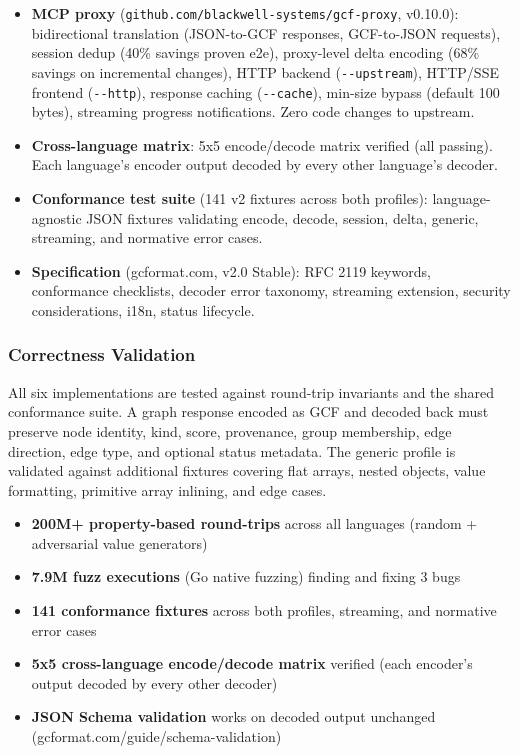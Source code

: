 \documentclass[
  11pt,
  paper=a4,
  ,captions=tableheading
]{scrartcl}
\providecommand{\tightlist}{%
  \setlength{\itemsep}{0pt}\setlength{\parskip}{0pt}}
\begin{document}
\begin{itemize}
  encodeDelta, StreamEncoder, GenericStreamEncoder. CLI with both
  profiles. Zero dependencies.
\item
  \textbf{MCP proxy} (\texttt{github.com/blackwell-systems/gcf-proxy},
  v0.10.0): bidirectional translation (JSON-to-GCF responses,
  GCF-to-JSON requests), session dedup (40\% savings proven e2e),
  proxy-level delta encoding (68\% savings on incremental changes), HTTP
  backend (\texttt{-\/-upstream}), HTTP/SSE frontend
  (\texttt{-\/-http}), response caching (\texttt{-\/-cache}), min-size
  bypass (default 100 bytes), streaming progress notifications. Zero
  code changes to upstream.
\item
  \textbf{Cross-language matrix}: 5x5 encode/decode matrix verified (all
  passing). Each language's encoder output decoded by every other
  language's decoder.
\item
  \textbf{Conformance test suite} (141 v2 fixtures across both
  profiles): language-agnostic JSON fixtures validating encode, decode,
  session, delta, generic, streaming, and normative error cases.
\item
  \textbf{Specification} (gcformat.com, v2.0 Stable): RFC 2119 keywords,
  conformance checklists, decoder error taxonomy, streaming extension,
  security considerations, i18n, status lifecycle.
\end{itemize}

\subsubsection{Correctness Validation}\label{correctness-validation}

All six implementations are tested against round-trip invariants and the
shared conformance suite. A graph response encoded as GCF and decoded
back must preserve node identity, kind, score, provenance, group
membership, edge direction, edge type, and optional status metadata. The
generic profile is validated against additional fixtures covering flat
arrays, nested objects, value formatting, primitive array inlining, and
edge cases.

\begin{itemize}
\tightlist
\item
  \textbf{200M+ property-based round-trips} across all languages (random
  + adversarial value generators)
\item
  \textbf{7.9M fuzz executions} (Go native fuzzing) finding and fixing 3
  bugs
\item
  \textbf{141 conformance fixtures} across both profiles, streaming, and
  normative error cases
\item
  \textbf{5x5 cross-language encode/decode matrix} verified (each
  encoder's output decoded by every other decoder)
\item
  \textbf{JSON Schema validation} works on decoded output unchanged
  (gcformat.com/guide/schema-validation)
\end{itemize}
\end{document}
